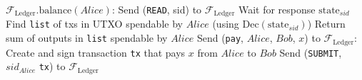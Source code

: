   \begin{algorithmic}[1]
    \State $\mathcal{F}_{\mathrm{Ledger}}\mathrm{.balance}\left(Alice\right)$:
    \State
    \State Send (\texttt{READ}, sid) to $\mathcal{F}_{\mathrm{Ledger}}$ 
    \State Wait for response $\mathrm{state}_{sid}$
    \State Find \texttt{list} of txs in UTXO spendable by $Alice$ (using
    $\mathrm{Dec}\left(\mathrm{state}_{sid}\right)$) 
    \State Return sum of outputs in \texttt{list} spendable by $Alice$ 
    \State
    \State
    \State Send (\texttt{pay}, $Alice$, $Bob$, $x$) to $\mathcal{F}_{\mathrm{Ledger}}$:
    \State
    \State Create and sign transaction \texttt{tx} that pays $x$ from $Alice$ to $Bob$
    \State Send (\texttt{SUBMIT}, $sid_{Alice}$ \texttt{tx}) to
    $\mathcal{F}_{\mathrm{Ledger}}$
  \end{algorithmic}
\hrulefill
